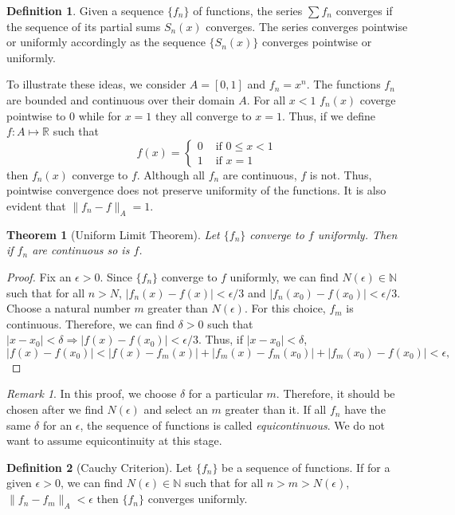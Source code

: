 \documentclass{article}
\theoremstyle{plain}
\newtheorem{thm}{Theorem}
\numberwithin{thm}{section}
\theoremstyle{plain}
\numberwithin{prop}{section}
\theoremstyle{definition}
\newtheorem{defn}{Definition}
\numberwithin{defn}{section}
\theoremstyle{remark}
\newtheorem*{rem}{Remark}
\numberwithin{equation}{section}
\begin{document}
\begin{defn}\label{s5d4}
Given a sequence $\{f_n\}$ of functions, the series $\sum f_n$ converges if
the sequence of its partial sums $S_n(x)$ converges. The series converges
pointwise or uniformly accordingly as the sequence $\{S_n(x)\}$ converges 
pointwise or uniformly.
\end{defn}

To illustrate these ideas, we consider $A = [0, 1]$ and $f_n = x^n$. The
functions $f_n$ are bounded and continuous over their domain $A$. For all $x < 1$
$f_n(x)$ coverge pointwise to $0$ while for $x=1$ they all converge to $x=1$.
Thus, if we define $f: A \mapsto \mathbb{R}$ such that
\[
f(x) = \begin{cases}
0 & \text{ if } 0 \le x < 1 \\
1 & \text{ if } x = 1
\end{cases}
\]
then $f_n(x)$ converge to $f$. Although all $f_n$ are continuous, $f$ is not.
Thus, pointwise convergence does not preserve uniformity of the functions. It
is also evident that $\lVert f_n - f \rVert_A = 1$.

\begin{thm}[Uniform Limit Theorem]\label{s5t1}
Let $\{f_n\}$ converge to $f$ uniformly. Then if $f_n$ are continuous so is $f$.
\end{thm}
\begin{proof}
Fix an $\epsilon > 0$. Since $\{f_n\}$ converge to $f$ uniformly, we can find
$N(\epsilon) \in \mathbb{N}$ such that for all $n > N$, $|f_n(x) - f(x)| < 
\epsilon/3$ and $|f_n(x_0) - f(x_0)| < \epsilon/3$. Choose a natural number $m$
greater than $N(\epsilon)$. For this choice, $f_m$ is continuous. Therefore, we
can find $\delta > 0$ such that $|x - x_0| < \delta \Rightarrow |f(x) - f(x_0)|
< \epsilon/3$. Thus, if $|x - x_0| < \delta$,
\[
|f(x) - f(x_0)| < |f(x) - f_m(x)| + |f_m(x) - f_m(x_0)| + |f_m(x_0) - f(x_0)|
< \epsilon,
\]
\end{proof}
\begin{rem}
In this proof, we choose $\delta$ for a particular $m$. Therefore, it should
be chosen after we find $N(\epsilon)$ and select an $m$ greater than it. If all
$f_n$ have the same $\delta$ for an $\epsilon$, the sequence of functions is 
called \emph{equicontinuous}. We do not want to assume equicontinuity at this
stage.
\end{rem}

\begin{defn}[Cauchy Criterion]\label{s5d5}
Let $\{f_n\}$ be a sequence of functions. If for a given $\epsilon > 0$, we
can find $N(\epsilon) \in \mathbb{N}$ such that for all $n > m > N(\epsilon)$,
$\lVert f_n - f_m \rVert_A < \epsilon$ then $\{f_n\}$ converges uniformly.
\end{defn}
\end{document}
